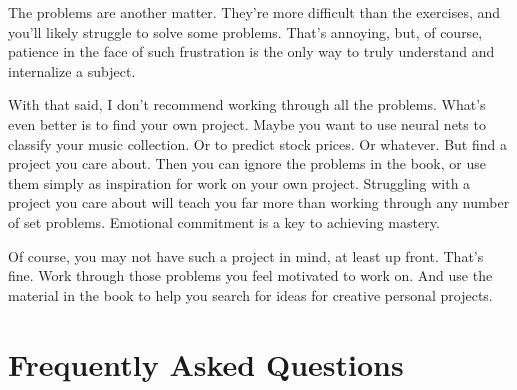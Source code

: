 The problems are another matter. They're more difficult than the exercises, and you'll likely struggle to solve some problems. That's annoying, but, of course, patience in the face of such frustration is the only way to truly understand and internalize a subject.

With that said, I don't recommend working through all the problems. What's even better is to find your own project. Maybe you want to use neural nets to classify your music collection. Or to predict stock prices. Or whatever. But find a project you care about. Then you can ignore the problems in the book, or use them simply as inspiration for work on your own project. Struggling with a project you care about will teach you far more than working through any number of set problems. Emotional commitment is a key to achieving mastery.

Of course, you may not have such a project in mind, at least up front. That's fine. Work through those problems you feel motivated to work on. And use the material in the book to help you search for ideas for creative personal projects.

\section*{Frequently Asked Questions}
\label{sec:FrequentlyAskedQuestions}

